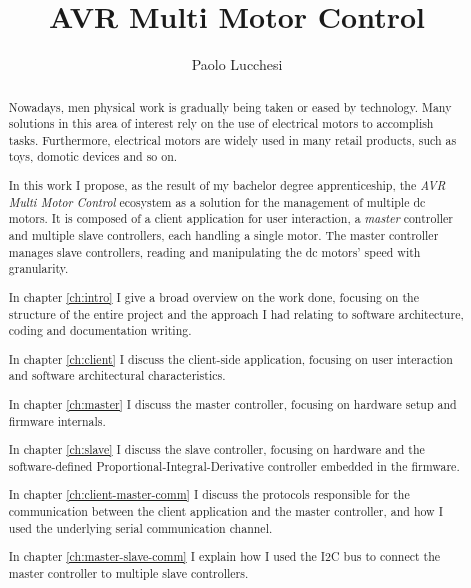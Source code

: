 \documentclass[binding=0.6cm,Lau]{sapthesis}
\title{AVR Multi Motor Control}
\author{Paolo Lucchesi}
\begin{document}
\frontmatter
\maketitle

\dedication{
Dedicated to my family, my granddad Pietro, my mom Anna Rosa, my dad Marco,
my grandmom Pierina and my sister Valentina, which I thank everyday for
everything I am.\\
To my dearest friends in Pitigliano, with whom I share some of the most
beautiful memories I have.\\
To Nicola, with whom I have shared part of this path; he helped me in a
dark period of my life and he is one of my dearest friends.
}

\begin{abstract}
  Nowadays, men physical work is gradually being taken or eased by technology.
  Many solutions in this area of interest rely on the use of electrical motors
  to accomplish tasks. Furthermore, electrical motors are widely used in many
  retail products, such as toys, domotic devices and so on.

  In this work I propose, as the result of my bachelor degree apprenticeship,
  the \emph{AVR Multi Motor Control} ecosystem as a solution for the management
  of multiple dc motors. It is composed of a client application for user
  interaction, a \emph{master} controller and multiple slave controllers, each
  handling a single motor. The master controller manages slave controllers,
  reading and manipulating the dc motors' speed with granularity.

  In chapter \ref{ch:intro} I give a broad overview on the work done, focusing
  on the structure of the entire project and the approach I had relating to 
  software architecture, coding and documentation writing.

  In chapter \ref{ch:client} I discuss the client-side application, focusing on
  user interaction and software architectural characteristics.

  In chapter \ref{ch:master} I discuss the master controller, focusing on
  hardware setup and firmware internals.

  In chapter \ref{ch:slave} I discuss the slave controller, focusing on
  hardware and the software-defined Proportional-Integral-Derivative controller
  embedded in the firmware.

  In chapter \ref{ch:client-master-comm} I discuss the protocols responsible
  for the communication between the client application and the master
  controller, and how I used the underlying serial communication channel.

  In chapter \ref{ch:master-slave-comm} I explain how I used the I2C bus to
  connect the master controller to multiple slave controllers.
\end{abstract}
\end{document}
